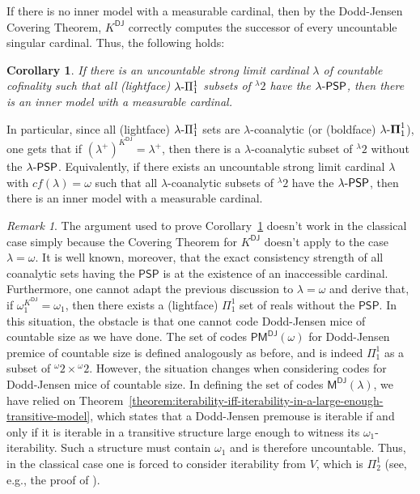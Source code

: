 \documentclass{amsart}
\numberwithin{equation}{section}
\def\hyp{{\hbox{-}}}
\newtheorem{corollary}[theorem]{Corollary}
\theoremstyle{definition}
\theoremstyle{remark}
\newtheorem{remark}[theorem]{Remark}
\begin{document}
If there is no inner model with a measurable cardinal, then by the Dodd-Jensen Covering Theorem, $K^{\mathsf{DJ}}$ correctly computes the successor of every uncountable singular cardinal. Thus, the following holds: 

\begin{corollary}\label{c310}
	If there is an uncountable strong limit cardinal $\lambda$ of countable cofinality such that all \emph{(lightface)} $\lambda\hyp\Pi^1_1$ subsets of ${}^{\lambda}2$ have the $\lambda\hyp\mathsf{PSP}$, then there is an inner model with a measurable cardinal.
\end{corollary}

In particular, since all (lightface) $\lambda\hyp\Pi^1_1$ sets are $\lambda$-coanalytic (or (boldface) $\lambda\hyp\boldsymbol{\Pi}^1_1$), one gets that if $(\lambda^+)^{K^{\mathsf{DJ}}}=\lambda^+$, then there is a $\lambda$-coanalytic subset of ${}^{\lambda}2$ without the $\lambda\hyp\mathsf{PSP}$. Equivalently, if there exists an uncountable strong limit cardinal $\lambda$ with $cf(\lambda)=\omega$ such that all $\lambda$-coanalytic subsets of ${}^{\lambda}2$ have the $\lambda\hyp\mathsf{PSP}$, then there is an inner model with a measurable cardinal.

\begin{remark}
The argument used to prove Corollary~\ref{c310} doesn't work in the classical case simply because the Covering Theorem for $K^{\mathsf{DJ}}$ doesn't apply to the case $\lambda=\omega$. It is well known, moreover, that the exact consistency strength of all coanalytic sets having the $\mathsf{PSP}$ is at the existence of an inaccessible cardinal. Furthermore, one cannot adapt the previous discussion to $\lambda=\omega$ and derive that, if $\omega_1^{K^{\mathsf{DJ}}} = \omega_1$, then there exists a (lightface) $\Pi^1_1$ set of reals without the $\mathsf{PSP}$. In this situation, the obstacle is that one cannot code Dodd-Jensen mice of countable size as we have done. The set of codes $\mathsf{PM^{DJ}}(\omega)$ for Dodd-Jensen premice of countable size is defined analogously as before, and is indeed $\Pi^1_1$ as a subset of ${}^{\omega}2 \times {}^{\omega}2$. However, the situation changes when considering codes for Dodd-Jensen mice of countable size. In defining the set of codes $\mathsf{M^{DJ}}(\lambda)$, we have relied on Theorem~\ref{theorem:iterability-iff-iterability-in-a-large-enough-transitive-model}, which states that a Dodd-Jensen premouse is iterable if and only if it is iterable in a transitive structure large enough to witness its $\omega_1$-iterability. Such a structure must contain $\omega_1$ and is therefore uncountable. Thus, in the classical case one is forced to consider iterability from $V$, which is $\Pi^1_2$ (see, e.g., the proof of \cite[Theorem 20.18]{Kanamori}).
\end{remark}
\end{document}
